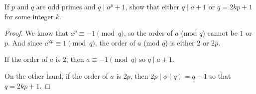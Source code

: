  If $p$ and $q$ are odd primes and $q\mid a^p + 1$, show
that either $q\mid a + 1$ or $q = 2kp + 1$ for some integer $k$.
\begin{proof}
  We know that $a^p\equiv-1\pmod{q}$, so the order of $a$ (mod $q$)
  cannot be $1$ or $p$. And since $a^{2p}\equiv1\pmod{q}$, the order
  of $a$ (mod $q$) is either $2$ or $2p$.

  If the order of $a$ is $2$, then $a\equiv-1\pmod{q}$ so
  $q\mid a + 1$.

  On the other hand, if the order of $a$ is $2p$, then
  $2p\mid\phi(q) = q - 1$ so that $q = 2kp + 1$.
\end{proof}
